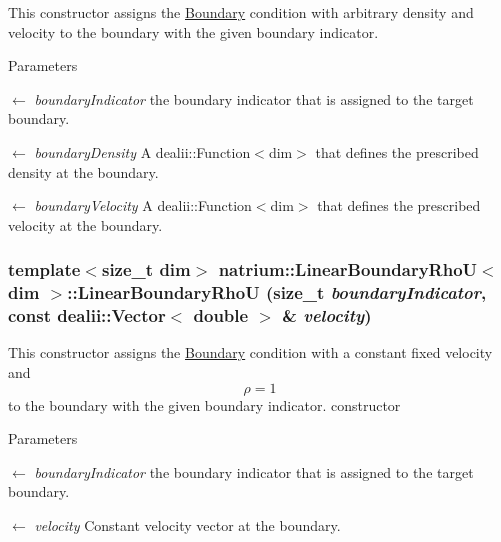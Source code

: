 This constructor assigns the \hyperlink{classnatrium_1_1Boundary}{Boundary} condition with arbitrary density and velocity to the boundary with the given boundary indicator. 
\begin{DoxyParams}{Parameters}
\item[\mbox{$\leftarrow$} {\em boundaryIndicator}]the boundary indicator that is assigned to the target boundary. \item[\mbox{$\leftarrow$} {\em boundaryDensity}]A dealii::Function$<$dim$>$ that defines the prescribed density at the boundary. \item[\mbox{$\leftarrow$} {\em boundaryVelocity}]A dealii::Function$<$dim$>$ that defines the prescribed velocity at the boundary. \end{DoxyParams}
\hypertarget{classnatrium_1_1LinearBoundaryRhoU_aefca829931a4c3e9c3f65e5889533c45}{
\subsubsection[{LinearBoundaryRhoU}]{\setlength{\rightskip}{0pt plus 5cm}template$<$size\_\-t dim$>$ {\bf natrium::LinearBoundaryRhoU}$<$ dim $>$::{\bf LinearBoundaryRhoU} (size\_\-t {\em boundaryIndicator}, \/  const dealii::Vector$<$ double $>$ \& {\em velocity})}}
\label{classnatrium_1_1LinearBoundaryRhoU_aefca829931a4c3e9c3f65e5889533c45}


This constructor assigns the \hyperlink{classnatrium_1_1Boundary}{Boundary} condition with a constant fixed velocity and \[ \rho = 1 \] to the boundary with the given boundary indicator. constructor


\begin{DoxyParams}{Parameters}
\item[\mbox{$\leftarrow$} {\em boundaryIndicator}]the boundary indicator that is assigned to the target boundary. \item[\mbox{$\leftarrow$} {\em velocity}]Constant velocity vector at the boundary. \end{DoxyParams}


